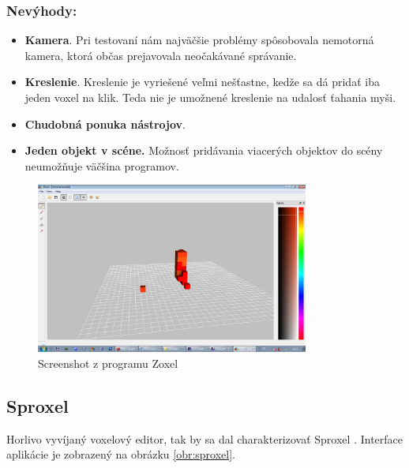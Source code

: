 \subsubsection{Nevýhody:}
\begin{itemize}
	\item \textbf{Kamera}. Pri testovaní nám najväčšie problémy spôsobovala nemotorná kamera, ktorá občas prejavovala neočakávané správanie.
	\item \textbf{Kreslenie}. Kreslenie je vyriešené veľmi nešťastne, kedže sa dá pridať iba jeden voxel na klik. Teda nie je umožnené kreslenie na udalosť ťahania myši.
	\item \textbf{Chudobná ponuka nástrojov}.
	\item \textbf{Jeden objekt v scéne.} Možnosť pridávania viacerých objektov do scény neumožňuje väčšina programov.
\end{itemize}

\begin{figure}[ht!]
	\centering
	\includegraphics[width=0.8\textwidth]{zoxel.jpg}
	\caption[Zoxel]{Screenshot z programu Zoxel}
	\label{obr:zoxel}
\end{figure}

\subsection{Sproxel}
Horlivo vyvíjaný voxelový editor, tak by sa dal charakterizovať Sproxel \cite{sproxel}. Interface aplikácie je zobrazený na obrázku \ref{obr:sproxel}.
